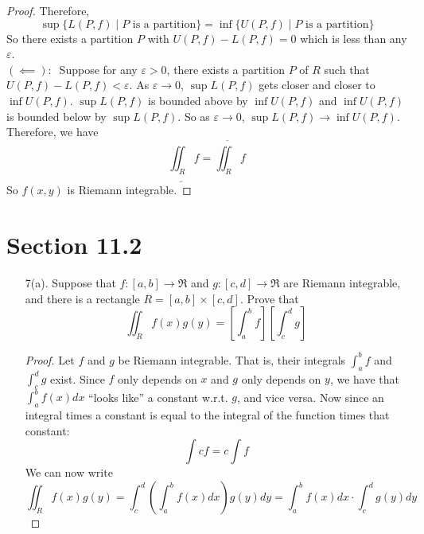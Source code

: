 \documentclass[hidelinks,12pt]{article}
\begin{document}
\begin{enumerate}
\begin{proof}
            Therefore, \[\sup\{L(P,f)\mid P\text{ is a partition}\}=\inf\{U(P,f)\mid P\text{ is a partition}\}\] So there exists a partition $P$ with $U(P,f)-L(P,f)=0$ which is less than any $\varepsilon$.\\
            $(\impliedby):\ $ Suppose for any $\varepsilon>0$, there exists a partition $P$ of $R$ such that $U(P,f)-L(P,f)<\varepsilon$. As $\varepsilon\to0$, $\sup{L(P,f)}$ gets closer and closer to $\inf{U(P,f)}$. $\sup{L(P,f)}$ is bounded above by $\inf{U(P,f)}$ and $\inf{U(P,f)}$ is bounded below by $\sup{L(P,f)}$. So as $\varepsilon\to0$, $\sup{L(P,f)}\to\inf{U(P,f)}$. Therefore, we have \[\underline{\iint_R}f=\overline{\iint_R}f\]
            So $f(x,y)$ is Riemann integrable.
        \end{proof}
\end{enumerate}
\section{Section 11.2}
\begin{enumerate}
    \item[7(a).]
        Suppose that $f:[a,b]\to\mathfrak{R}$ and $g:[c,d]\to\mathfrak{R}$ are Riemann integrable, and there is a rectangle $R=[a,b]\times[c,d]$. Prove that \[\iint_R f(x)g(y)=\left[\int_a^bf\right]\left[\int_c^dg\right]\]
        \begin{proof}
            Let $f$ and $g$ be Riemann integrable. That is, their integrals $\int_a^bf$ and $\int_c^dg$ exist. Since $f$ only depends on $x$ and $g$ only depends on $y$, we have that $\int_a^bf(x)dx$ ``looks like'' a constant w.r.t. $g$, and vice versa. 
            Now since an integral times a constant is equal to the integral of the function times that constant:
            \[\int cf=c\int f\]
            We can now write
            \[\iint_R f(x)g(y)=\int_c^d\left(\int_a^bf(x)dx\right)g(y)dy=\int_a^bf(x)dx\cdot\int_c^dg(y)dy\]
        \end{proof}
\end{enumerate}
\end{document}
